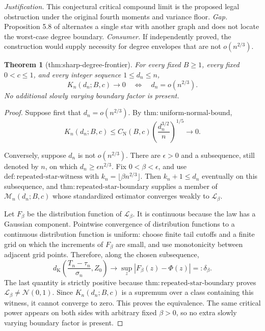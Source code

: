 \documentclass{article}
\newtheorem{theorem}{Theorem}
\begin{document}
\par\smallskip\noindent \textit{Justification.} This conjectural critical compound limit is the proposed legal obstruction under the original fourth moments and variance floor. \textit{Gap.} Proposition 5.8 of \cite{KandirosPipisDaskalakisHarshaw2024CGD} alternates a single star with another graph and does not locate the worst-case degree boundary. \textit{Consumer.} If independently proved, the construction would supply necessity for degree envelopes that are not \(o(n^{2/3})\).

\begin{theorem}[thm:sharp-degree-frontier]\label{thm:sharp-degree-frontier}
For every fixed \(B\ge1\), every fixed \(0<c\le1\), and every integer sequence \(1\le d_n\le n\), \[K_n(d_n;B,c)\longrightarrow0\quad\Longleftrightarrow\quad d_n=o(n^{2/3}).\] No additional slowly varying boundary factor is present.
\end{theorem}
\begin{proof}
Suppose first that \(d_n=o(n^{2/3})\).  By \(\mathrm{thm:uniform\text{-}normal\text{-}bound}\),
\[
 K_n(d_n;B,c)\le C_{\mathrm N}(B,c)
 \left(\frac{d_n^{3/2}}n\right)^{1/5}\longrightarrow0.
\]

Conversely, suppose \(d_n\) is not \(o(n^{2/3})\).  There are \(\epsilon>0\) and a subsequence, still denoted by \(n\), on which \(d_n\ge\epsilon n^{2/3}\).  Fix \(0<\beta<\epsilon\), and use \(\mathrm{def:repeated\text{-}star\text{-}witness}\) with \(k_n=\lfloor\beta n^{2/3}\rfloor\).  Then \(k_n+1\le d_n\) eventually on this subsequence, and \(\mathrm{thm:repeated\text{-}star\text{-}boundary}\) supplies a member of \(\mathcal M_n(d_n;B,c)\) whose standardized estimator converges weakly to \(\mathcal L_\beta\).

Let \(F_\beta\) be the distribution function of \(\mathcal L_\beta\).  It is continuous because the law has a Gaussian component.  Pointwise convergence of distribution functions to a continuous distribution function is uniform: choose finite tail cutoffs and a finite grid on which the increments of \(F_\beta\) are small, and use monotonicity between adjacent grid points.  Therefore, along the chosen subsequence,
\[
 d_{\mathrm K}\left(\frac{T_n-\tau_n}{\sigma_n},Z_0\right)
 \longrightarrow \sup_z|F_\beta(z)-\Phi(z)|=:\delta_\beta.
\]
The last quantity is strictly positive because \(\mathrm{thm:repeated\text{-}star\text{-}boundary}\) proves \(\mathcal L_\beta\ne\mathcal N(0,1)\).  Since \(K_n(d_n;B,c)\) is a supremum over a class containing this witness, it cannot converge to zero.  This proves the equivalence.  The same critical power appears on both sides with arbitrary fixed \(\beta>0\), so no extra slowly varying boundary factor is present.
\end{proof}
\end{document}
